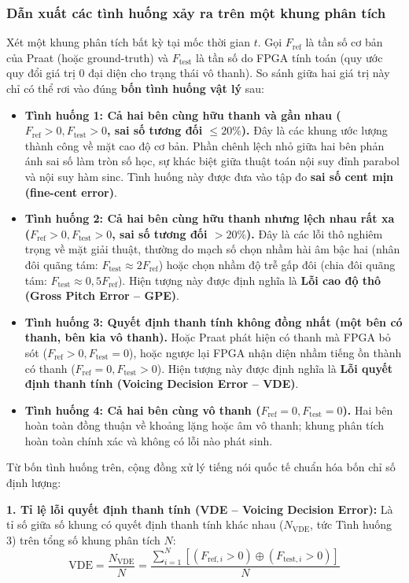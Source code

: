 \subsubsection*{Dẫn xuất các tình huống xảy ra trên một khung phân tích}
Xét một khung phân tích bất kỳ tại mốc thời gian $t$. Gọi $F_{\text{ref}}$ là tần số cơ bản của Praat (hoặc ground-truth) và $F_{\text{test}}$ là tần số do FPGA tính toán (quy ước quy đổi giá trị 0 đại diện cho trạng thái vô thanh). So sánh giữa hai giá trị này chỉ có thể rơi vào đúng \textbf{bốn tình huống vật lý} sau:
\begin{itemize}[leftmargin=1.5em, itemsep=3pt]
    \item \textbf{Tình huống 1: Cả hai bên cùng hữu thanh và gần nhau ($F_{\text{ref}} > 0, F_{\text{test}} > 0$, sai số tương đối $\le 20\%$).} Đây là các khung ước lượng thành công về mặt cao độ cơ bản. Phần chênh lệch nhỏ giữa hai bên phản ánh sai số làm tròn số học, sự khác biệt giữa thuật toán nội suy đỉnh parabol và nội suy hàm sinc. Tình huống này được đưa vào tập đo \textbf{sai số cent mịn (fine-cent error)}.
    \item \textbf{Tình huống 2: Cả hai bên cùng hữu thanh nhưng lệch nhau rất xa ($F_{\text{ref}} > 0, F_{\text{test}} > 0$, sai số tương đối $> 20\%$).} Đây là các lỗi thô nghiêm trọng về mặt giải thuật, thường do mạch số chọn nhầm hài âm bậc hai (nhân đôi quãng tám: $F_{\text{test}} \approx 2 F_{\text{ref}}$) hoặc chọn nhầm độ trễ gấp đôi (chia đôi quãng tám: $F_{\text{test}} \approx 0{,}5 F_{\text{ref}}$). Hiện tượng này được định nghĩa là \textbf{Lỗi cao độ thô (Gross Pitch Error -- GPE)}.
    \item \textbf{Tình huống 3: Quyết định thanh tính không đồng nhất (một bên có thanh, bên kia vô thanh).} Hoặc Praat phát hiện có thanh mà FPGA bỏ sót ($F_{\text{ref}} > 0, F_{\text{test}} = 0$), hoặc ngược lại FPGA nhận diện nhầm tiếng ồn thành có thanh ($F_{\text{ref}} = 0, F_{\text{test}} > 0$). Hiện tượng này được định nghĩa là \textbf{Lỗi quyết định thanh tính (Voicing Decision Error -- VDE)}.
    \item \textbf{Tình huống 4: Cả hai bên cùng vô thanh ($F_{\text{ref}} = 0, F_{\text{test}} = 0$).} Hai bên hoàn toàn đồng thuận về khoảng lặng hoặc âm vô thanh; khung phân tích hoàn toàn chính xác và không có lỗi nào phát sinh.
\end{itemize}

Từ bốn tình huống trên, cộng đồng xử lý tiếng nói quốc tế chuẩn hóa bốn chỉ số định lượng:

\textbf{1. Tỉ lệ lỗi quyết định thanh tính (VDE -- Voicing Decision Error):}
Là tỉ số giữa số khung có quyết định thanh tính khác nhau ($N_{\text{VDE}}$, tức Tình huống 3) trên tổng số khung phân tích $N$:
\begin{equation}
\text{VDE} = \frac{N_{\text{VDE}}}{N} = \frac{\sum_{i=1}^N \left[ (F_{\text{ref},i} > 0) \oplus (F_{\text{test},i} > 0) \right]}{N}
\end{equation}

